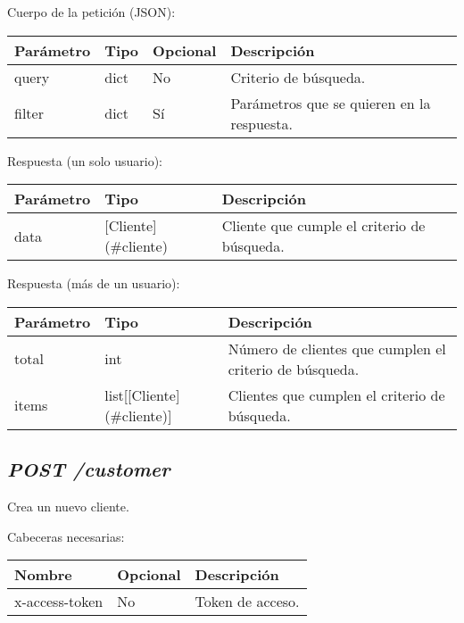 Cuerpo de la petición (JSON):
\begin{table}[!h]
	\centering
	\begin{adjustbox}{max width=\textwidth}
	\begin{tabular}{|l|l|l|l|}
		\hline
		Parámetro & Tipo & Opcional & Descripción \\ \hline
		query & dict & No & Criterio de búsqueda. \\ \hline
		filter & dict & Sí & Parámetros que se quieren en la respuesta. \\ \hline
	\end{tabular}
\end{adjustbox}
\end{table}

Respuesta (un solo usuario):
\begin{table}[!h]
	\centering
	
	\begin{adjustbox}{max width=\textwidth}
	\begin{tabular}{|l|l|l|}
		\hline
		Parámetro & Tipo & Descripción \\ \hline
		data & [Cliente](\#cliente) & Cliente que cumple el criterio de búsqueda. \\ \hline
	\end{tabular}
\end{adjustbox}
\end{table}

Respuesta (más de un usuario):
\begin{table}[!h]
	\centering
	\begin{adjustbox}{max width=\textwidth}
	\begin{tabular}{|l|l|l|}
		\hline
		Parámetro & Tipo & Descripción \\ \hline
		total & int & Número de clientes que cumplen el criterio de búsqueda. \\ \hline
		items & list[[Cliente](\#cliente)] & Clientes que cumplen el criterio de búsqueda. \\ \hline
	\end{tabular}
\end{adjustbox}
\end{table}



\subsection{\textit{POST /customer}}
Crea un nuevo cliente.

Cabeceras necesarias:
\begin{table}[h!]
	\centering
	\begin{tabular}{|l|l|l|}
		\hline
		Nombre & Opcional & Descripción \\ \hline
		x-access-token & No & Token de acceso. \\ \hline
	\end{tabular}
\end{table}

